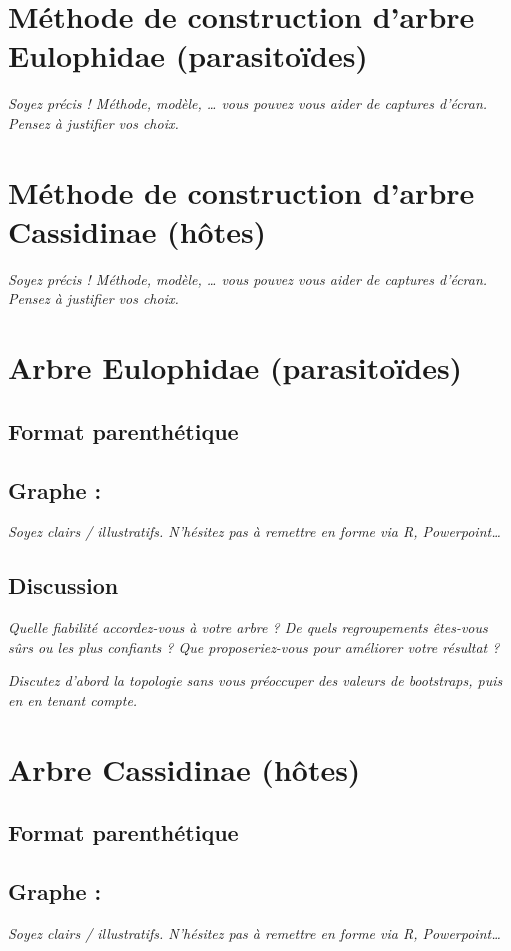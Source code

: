 \documentclass[a4paper, 11pt]{article}
\begin{document}
\section{Méthode de construction d'arbre Eulophidae (parasitoïdes)}

\textit{Soyez précis ! Méthode, modèle, … vous pouvez vous aider de captures d’écran. Pensez à justifier vos choix.}

\section{Méthode de construction d'arbre Cassidinae (hôtes)}

\emph{Soyez précis ! Méthode, modèle, … vous pouvez vous aider de captures d’écran. Pensez à justifier vos choix.}

\section{Arbre Eulophidae (parasitoïdes)}
\subsection{Format parenthétique} 


\subsection{Graphe :}
\emph{Soyez clairs / illustratifs. N’hésitez pas à remettre en forme via R, Powerpoint…}

\subsection{Discussion}
\emph{Quelle fiabilité accordez-vous à votre arbre ? De quels regroupements êtes-vous sûrs ou les plus confiants ? Que proposeriez-vous pour améliorer votre résultat ?}

\emph{Discutez d’abord la topologie sans vous préoccuper des valeurs de bootstraps, puis en en tenant compte.}

\section{Arbre Cassidinae (hôtes)}
\subsection{Format parenthétique} 


\subsection{Graphe :}
\emph{Soyez clairs / illustratifs. N’hésitez pas à remettre en forme via R, Powerpoint…}
\end{document}
